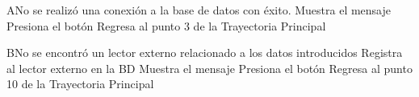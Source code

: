 
		\begin{UCtrayectoriaA}{A}{No se realizó una conexión a la base de datos con éxito.}
			\UCpaso[\UCsist] Muestra el mensaje 
			\UCpaso[\UCactor] Presiona el botón 
			\UCpaso[\UCsist] Regresa al punto 3 de la Trayectoria Principal
		\end{UCtrayectoriaA}

		\begin{UCtrayectoriaA}{B}{No se encontró un lector externo relacionado a los datos introducidos}
			\UCpaso[\UCsist] Registra al lector externo en la BD
			\UCpaso[\UCsist]	Muestra el mensaje 
			\UCpaso[\UCactor] Presiona el botón 
			\UCpaso[\UCsist] Regresa al punto 10 de la Trayectoria Principal
		\end{UCtrayectoriaA}
		
